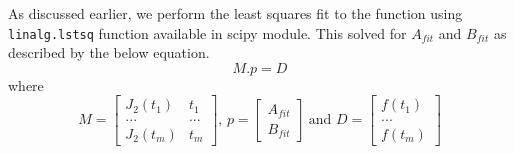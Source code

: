 \documentclass[11pt, a4paper]{article}
\begin{document}
            As discussed earlier, we perform the least squares fit to the function using \texttt{linalg.lstsq} function available in scipy module. This solved for $A_{fit}$ and $B_{fit}$ as described by the below equation.
            \begin{equation}
            M.p = D \label{eq5}
            \end{equation}
            where
            \begin{equation}
            M=\left[\begin{matrix}
            J_2(t_1)&t_1\\
            ...&...\\
            J_2(t_m)&t_m
            \end{matrix}\right]\text{, }p=\left[\begin{matrix}
            A_{fit}\\B_{fit}
            \end{matrix}\right]\ \text{and }D=\left[\begin{matrix}f(t_1)\\...\\f(t_m)\end{matrix}\right]
            \end{equation}\\

            
\end{document}
